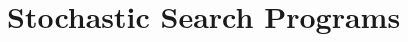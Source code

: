 
\chapter{Stochastic Search Programs}
\label{chapter:stochastic}

\clearpage


\clearpage


\clearpage


\clearpage


\clearpage


\clearpage

